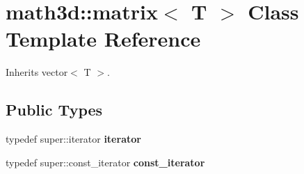 \section{math3d\-:\-:matrix$<$ T $>$ Class Template Reference}
\label{classmath3d_1_1matrix}


Inherits vector$<$ T $>$.

\subsection*{Public Types}
\begin{DoxyCompactItemize}
\item 
typedef super\-::iterator {\bfseries iterator}\label{classmath3d_1_1matrix_a35a6c10b4922047e7965413bbe8f5dfb}

\item 
typedef super\-::const\-\_\-iterator {\bfseries const\-\_\-iterator}\label{classmath3d_1_1matrix_a7c01844815b6f9155f80ef80e8c1e122}

\end{DoxyCompactItemize}
